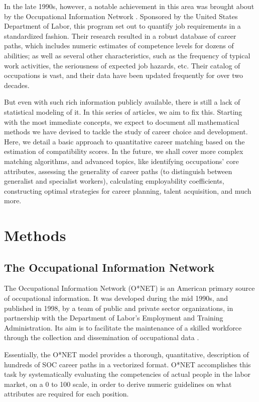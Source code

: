 \documentclass{article}
\begin{document}
In the late 1990s, however, a notable achievement in this area was brought
about by the Occupational Information Network \parencite{onet1998data}. Sponsored by the United States Department of Labor, this
program set out to quantify job requirements in a standardized fashion. Their
research resulted in a robust database of career paths, which includes numeric
estimates of competence levels for dozens of abilities; as well as several
other characteristics, such as the frequency of typical work activities, the
seriousness of expected job hazards, etc. Their catalog of occupations is vast,
and their data have been updated frequently for over two decades.

But even with such rich information publicly available, there is still a lack
of statistical modeling of it. In this series of articles, we aim to fix this.
Starting with the most immediate concepts, we expect to document all
mathematical methods we have devised to tackle the study of career choice and
development. Here, we detail a basic approach to quantitative career matching
based on the estimation of compatibility scores. In the future, we shall cover
more complex matching algorithms, and advanced topics, like identifying
occupations' core attributes, assessing the generality of career paths (to
distinguish between generalist and specialist workers), calculating
employability coefficients, constructing optimal strategies for career
planning, talent acquisition, and much more.

\section{Methods}
\subsection{The Occupational Information Network}
The Occupational Information Network (O*NET) is an American primary source of
occupational information. It was developed during the mid 1990s, and published
in 1998, by a team of public and private sector organizations, in partnership
with the Department of Labor's Employment and Training Administration. Its aim
is to facilitate the maintenance of a skilled workforce through the collection
and dissemination of occupational data \parencites{mariani1999onet}{onet2024about}.

Essentially, the O*NET model provides a thorough, quantitative, description of
hundreds of SOC \parencite[Standard Occupational Classification, see][]{bls2018soc} career paths in
a vectorized format. O*NET accomplishes this task by systematically evaluating
the competencies of actual people in the labor market, on a 0 to 100 scale, in
order to derive numeric guidelines on what attributes are required for each
position.
\end{document}
